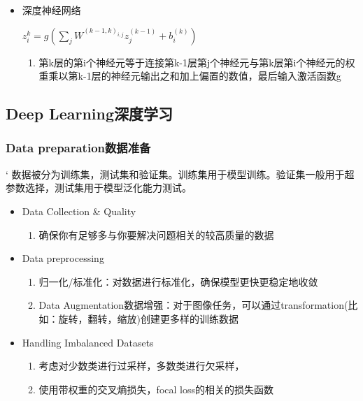 \documentclass[UTF8]{ctexart}
\begin{document}
\begin{itemize}
    \item 深度神经网络
    
    $z_{i}^{k}=g(\sum\limits_{j}W^{(k-1,k)_{i,j}}z^{(k-1)}_{j}+b^{(k)}_i)$
    \begin{enumerate}
        \item 第k层的第i个神经元等于连接第k-1层第j个神经元与第k层第i个神经元的权重乘以第k-1层的神经元输出之和加上偏置的数值，最后输入激活函数g
    \end{enumerate}
\end{itemize}

\subsection{Deep Learning深度学习}
\subsubsection{Data preparation数据准备}‘
数据被分为训练集，测试集和验证集。训练集用于模型训练。验证集一般用于超参数选择，测试集用于模型泛化能力测试。
\begin{itemize}
    \item Data Collection \& Quality
    \begin{enumerate}
        \item 确保你有足够多与你要解决问题相关的较高质量的数据
    \end{enumerate}
    \item Data preprocessing
    \begin{enumerate}
        \item 归一化/标准化：对数据进行标准化，确保模型更快更稳定地收敛
        \item Data Augmentation数据增强：对于图像任务，可以通过transformation(比如：旋转，翻转，缩放)创建更多样的训练数据
    \end{enumerate}
    \item Handling Imbalanced Datasets
    \begin{enumerate}
        \item 考虑对少数类进行过采样，多数类进行欠采样，
        \item 使用带权重的交叉熵损失，focal loss的相关的损失函数
    \end{enumerate}
\end{itemize}
\end{document}
